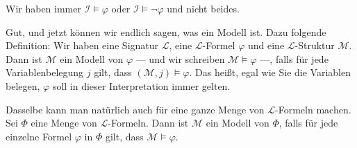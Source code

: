 \begin{math-stroke}

\begin{remark}
Wir haben immer $\mathcal{I} \models \varphi$ oder $\mathcal{I} \models \neg \varphi$ und nicht beides.
\end{remark}
\end{math-stroke}

\begin{spoken-clean}[01:04:03 - 01:06:33]
Gut, und jetzt können wir endlich sagen, was ein Modell ist. Dazu folgende Definition: Wir haben eine Signatur $\mathcal{L}$, eine $\mathcal{L}$-Formel $\varphi$ und eine $\mathcal{L}$-Struktur $\mathcal{M}$. Dann ist $\mathcal{M}$ ein Modell von $\varphi$ --- und wir schreiben $\mathcal{M} \models \varphi$ ---, falls für jede Variablenbelegung $j$ gilt, dass $(\mathcal{M}, j) \models \varphi$. Das heißt, egal wie Sie die Variablen belegen, $\varphi$ soll in dieser Interpretation immer gelten.

Dasselbe kann man natürlich auch für eine ganze Menge von $\mathcal{L}$-Formeln machen. Sei $\Phi$ eine Menge von $\mathcal{L}$-Formeln. Dann ist $\mathcal{M}$ ein Modell von $\Phi$, falls für jede einzelne Formel $\varphi$ in $\Phi$ gilt, dass $\mathcal{M} \models \varphi$.
\end{spoken-clean}


